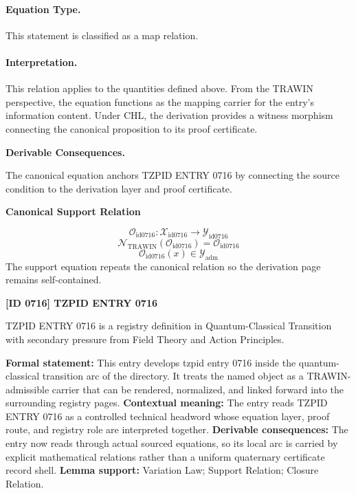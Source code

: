 \paragraph{Equation Type.}
This statement is classified as a map relation.

\paragraph{Interpretation.}
This relation applies to the quantities defined above. From the TRAWIN perspective, the equation functions as the mapping carrier for the entry’s information content. Under CHL, the derivation provides a witness morphism connecting the canonical proposition to its proof certificate.

\par\vspace{0.35em}
\noindent\textbf{Derivable Consequences.}\quad
\begingroup
\footnotesize
\raggedright
The canonical equation anchors TZPID ENTRY 0716 by connecting the source condition to the derivation layer and proof certificate.
\par\endgroup

\noindent\textbf{Canonical Support Relation}\par
\[
\mathcal{O}_{\mathrm{id0716}}:\mathcal{X}_{\mathrm{id0716}}\longrightarrow\mathcal{Y}_{\mathrm{id0716}}
\]
\[
\mathcal{N}_{\mathrm{TRAWIN}}(\mathcal{O}_{\mathrm{id0716}})=\mathcal{O}_{\mathrm{id0716}}
\]
\[
\mathcal{O}_{\mathrm{id0716}}(x)\in\mathcal{Y}_{\mathrm{adm}}
\]
\noindent The support equation repeats the canonical relation so the derivation page remains self-contained.\par

\clearpage
\noindent\textbf{[ID 0716] TZPID ENTRY 0716}\par
\vspace{0.35em}
\begingroup\small
{}
TZPID ENTRY 0716 is a registry definition in Quantum-Classical Transition with secondary pressure from Field Theory and Action Principles.

\begingroup\footnotesize\setlength{\emergencystretch}{3em}\sloppy
\textbf{Formal statement:} This entry develops tzpid entry 0716 inside the quantum-classical transition arc of the directory. It treats the named object as a TRAWIN-admissible carrier that can be rendered, normalized, and linked forward into the surrounding registry pages. \textbf{Contextual meaning:} The entry reads TZPID ENTRY 0716 as a controlled technical headword whose equation layer, proof route, and registry role are interpreted together. \textbf{Derivable consequences:} The entry now reads through actual sourced equations, so its local arc is carried by explicit mathematical relations rather than a uniform quaternary certificate record shell. \textbf{Lemma support:} Variation Law; Support Relation; Closure Relation.\par
\endgroup

